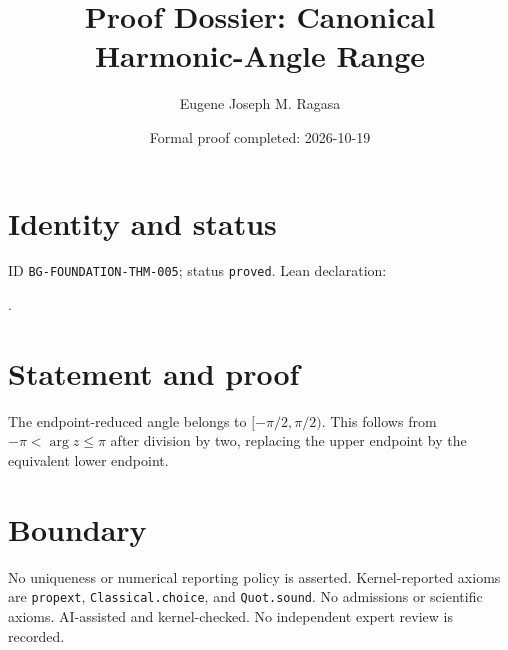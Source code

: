 \documentclass[11pt]{article}
\title{Proof Dossier: Canonical Harmonic-Angle Range}\author{Eugene Joseph M. Ragasa}\date{Formal proof completed: 2026-10-19}
\begin{document}
\maketitle
\section{Identity and status}
ID \texttt{BG-FOUNDATION-THM-005}; status \texttt{proved}. Lean declaration:
\par{}.
\section{Statement and proof}
The endpoint-reduced angle belongs to $[-\pi/2,\pi/2)$. This follows from
$-\pi<\arg z\le\pi$ after division by two, replacing the upper endpoint by the equivalent
lower endpoint.
\section{Boundary}
No uniqueness or numerical reporting policy is asserted. Kernel-reported axioms are
\texttt{propext}, \texttt{Classical.choice}, and \texttt{Quot.sound}. No admissions or
scientific axioms. AI-assisted and kernel-checked. No independent expert review is
recorded.
\end{document}
